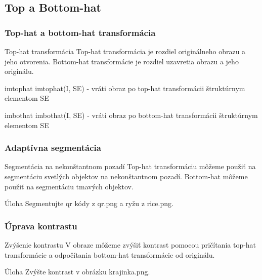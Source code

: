 \documentclass{beamer}
\begin{document}
\subsection{Top a Bottom-hat}

\begin{frame}
\frametitle{Top-hat a bottom-hat transformácia} 

  \begin{block}{Top-hat transformácia}
  Top-hat transformácia je rozdiel originálneho obrazu a jeho otvorenia. Bottom-hat transformácie je rozdiel uzavretia obrazu a jeho originálu. 
  \end{block}  
  
  \begin{block}{imtophat}
  imtophat(I, SE) - vráti obraz po top-hat transformácii štruktúrnym elementom SE
  \end{block}    
  
  \begin{block}{imbothat}
  imbothat(I, SE) - vráti obraz po bottom-hat transformácii štruktúrnym elementom SE
  \end{block}      
\end{frame}

\begin{frame}
\frametitle{Adaptívna segmentácia} 

  \begin{block}{Segmentácia na nekonštantnom pozadí}
  Top-hat transformáciu môžeme použiť na segmentáciu svetlých objektov na nekonštantnom pozadí. Bottom-hat môžeme použiť na segmentáciu tmavých objektov.
  \end{block}  
  
  \begin{block}{Úloha}
  Segmentujte qr kódy z qr.png a ryžu z rice.png.
  \end{block}    
\end{frame}

\begin{frame}
\frametitle{Úprava kontrastu} 
  \begin{block}{Zvýšenie kontrastu}
  V obraze môžeme zvýšiť kontrast pomocou pričítania top-hat transformácie a odpočítania bottom-hat transformácie od originálu.
  \end{block} 
  
  \begin{block}{Úloha}
  Zvýšte kontrast v obrázku krajinka.png.
  \end{block}          
\end{frame}
\end{document}
